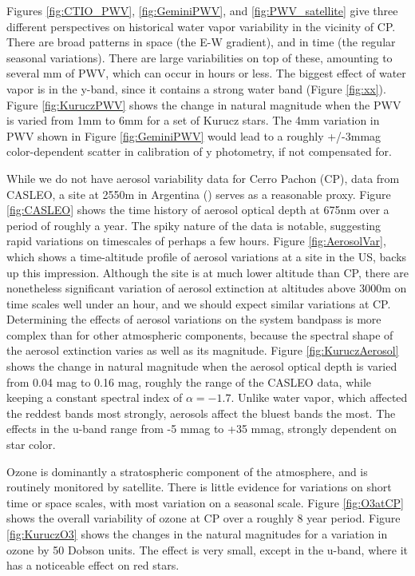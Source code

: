 \documentclass[12pt,preprint]{aastex}
\begin{document}
Figures \ref{fig:CTIO_PWV}, \ref{fig:GeminiPWV}, and \ref{fig:PWV_satellite} give three different perspectives on historical water vapor variability in the vicinity of CP.  There are broad patterns in space (the E-W gradient), and in time (the regular seasonal variations).  There are large variabilities on top of these, amounting to several mm of PWV, which can occur in hours or less.   The biggest effect of water vapor is in the y-band, since it contains a strong water band (Figure \ref{fig:xx}).   Figure \ref{fig:KuruczPWV} shows the change in natural magnitude when the PWV is varied from 1mm to 6mm for a set of Kurucz stars.  The 4mm variation in PWV shown in Figure \ref{fig:GeminiPWV} would lead to a roughly +/-3mmag color-dependent scatter in calibration of y photometry, if not compensated for. 

While we do not have aerosol variability data for Cerro Pachon (CP), data from CASLEO, a site at 2550m in Argentina (\citep{CASLEO}) serves as a reasonable proxy.  Figure \ref{fig:CASLEO} shows the time history of aerosol optical depth at 675nm over a period of roughly a year.  The spiky nature of the data is notable, suggesting rapid variations on timescales of perhaps a few hours.  Figure \ref{fig:AerosolVar}, which shows a time-altitude profile of aerosol variations at a site in the US, backs up this impression.  Although the site is at much lower altitude than CP, there are nonetheless significant variation of aerosol extinction at altitudes above 3000m on time scales well under an hour, and we should expect similar variations at CP.  Determining the effects of aerosol variations on the system bandpass is more complex than for other atmospheric components, because the spectral shape of the aerosol extinction varies as well as its magnitude.  Figure \ref{fig:KuruczAerosol} shows the change in natural magnitude when the aerosol optical depth is varied from 0.04 mag to 0.16 mag, roughly the range of the CASLEO data, while keeping a constant spectral index of $\alpha = -1.7$.  Unlike water vapor, which affected the reddest bands most strongly, aerosols affect the bluest bands the most.  The effects in the u-band range from -5 mmag to +35 mmag, strongly dependent on star color.

Ozone is dominantly a stratospheric component of the atmosphere, and is routinely monitored by satellite.   There is little evidence for variations on short time or space scales, with most variation on a seasonal scale.   Figure \ref{fig:O3atCP} shows the overall variability of ozone at CP over a roughly 8 year period.  Figure \ref{fig:KuruczO3} shows the changes in the natural magnitudes for a variation in ozone by 50 Dobson units.   The effect is very small, except in the u-band, where it has a noticeable effect on red stars.
\end{document}
